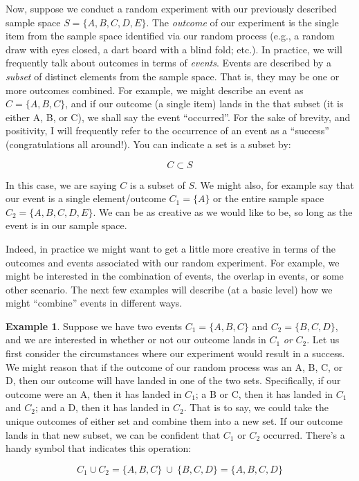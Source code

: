 \documentclass[
]{book}
\theoremstyle{definition}
\theoremstyle{definition}
\newtheorem{example}{Example}[chapter]
\theoremstyle{definition}
\theoremstyle{definition}
\theoremstyle{remark}
\begin{document}
Now, suppose we conduct a random experiment with our previously described sample space \(S = \{A, B, C, D, E\}\). The \emph{outcome} of our experiment is the single item from the sample space identified via our random process (e.g., a random draw with eyes closed, a dart board with a blind fold; etc.). In practice, we will frequently talk about outcomes in terms of \emph{events}. Events are described by a \emph{subset} of distinct elements from the sample space. That is, they may be one or more outcomes combined. For example, we might describe an event as \(C = \{A, B, C\}\), and if our outcome (a single item) lands in the that subset (it is either A, B, or C), we shall say the event ``occurred''. For the sake of brevity, and positivity, I will frequently refer to the occurrence of an event as a ``success'' (congratulations all around!). You can indicate a set is a subset by:

\[ C \subset S 
\label{eq:subset} \]

In this case, we are saying \(C\) is a subset of \(S\). We might also, for example say that our event is a single element/outcome \(C_1 = \{A\}\) or the entire sample space \(C_2 = \{A,B,C,D,E\}\). We can be as creative as we would like to be, so long as the event is in our sample space.

Indeed, in practice we might want to get a little more creative in terms of the outcomes and events associated with our random experiment. For example, we might be interested in the combination of events, the overlap in events, or some other scenario. The next few examples will describe (at a basic level) how we might ``combine'' events in different ways.

\begin{example}
Suppose we have two events \(C_1 = \{A,B,C\}\) and \(C_2 = \{B,C,D\}\), and we are interested in whether or not our outcome lands in \(C_1\) \emph{or} \(C_2\). Let us first consider the circumstances where our experiment would result in a success. We might reason that if the outcome of our random process was an A, B, C, or D, then our outcome will have landed in one of the two sets. Specifically, if our outcome were an A, then it has landed in \(C_1\); a B or C, then it has landed in \(C_1\) and \(C_2\); and a D, then it has landed in \(C_2\). That is to say, we could take the unique outcomes of either set and combine them into a new set. If our outcome lands in that new subset, we can be confident that \(C_1\) or \(C_2\) occurred. There's a handy symbol that indicates this operation:

\[ C_1 \cup C_2 = \{A,B,C\}\:\cup\:\{B,C,D\} = \{A,B,C,D\} 
\label{eq:union} \]
\end{example}
\end{document}
